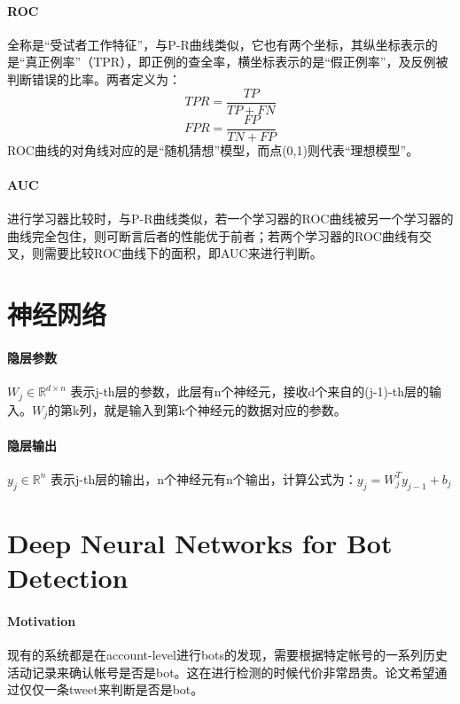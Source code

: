 \documentclass[10pt,letterpaper]{article}
\begin{document}
\paragraph{ROC} 全称是“受试者工作特征”，与P-R曲线类似，它也有两个坐标，其纵坐标表示的是“真正例率”（TPR），即正例的查全率，横坐标表示的是“假正例率”，及反例被判断错误的比率。两者定义为：\\
\begin{equation}
	TPR = \frac{TP}{TP + FN}
\end{equation}
\begin{equation}
	FPR = \frac{FP}{TN + FP}
\end{equation}
ROC曲线的对角线对应的是“随机猜想”模型，而点(0,1)则代表“理想模型”。

\paragraph{AUC} 进行学习器比较时，与P-R曲线类似，若一个学习器的ROC曲线被另一个学习器的曲线完全包住，则可断言后者的性能优于前者；若两个学习器的ROC曲线有交叉，则需要比较ROC曲线下的面积，即AUC来进行判断。

\section{神经网络}

\paragraph{隐层参数} $W_j \in \mathbb{R}^{d  \times n}$ 表示j-th层的参数，此层有n个神经元，接收d个来自的(j-1)-th层的输入。$W_j$的第k列，就是输入到第k个神经元的数据对应的参数。
\paragraph{隐层输出} $y_j \in \mathbb{R}^n$ 表示j-th层的输出，n个神经元有n个输出，计算公式为：$y_j = W_j^Ty_{j-1}+b_j$

\newpage
\section{Deep Neural Networks for Bot Detection\cite{kudugunta2018bot}}

\paragraph{Motivation} 现有的系统都是在account-level进行bots的发现，需要根据特定帐号的一系列历史活动记录来确认帐号是否是bot。这在进行检测的时候代价非常昂贵。论文希望通过仅仅一条tweet来判断是否是bot。
\end{document}
